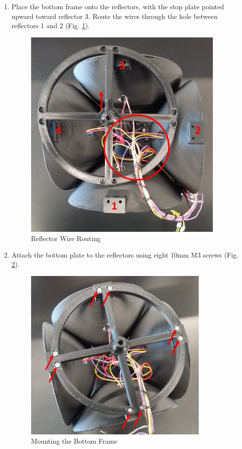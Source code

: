 \begin{enumerate}[label = \textbf{Step \arabic*.}]
    \item Place the bottom frame onto the reflectors, with the stop plate pointed upward toward reflector 3. Route the wires through the hole between reflectors 1 and 2 (Fig. \ref{fig:reflectorWireRouting}).
    \begin{figure}[H]
        \centering
        \includegraphics[width=3.9in]{figs/img/assembly/25-reflectorWireRouting.png}
        \caption{Reflector Wire Routing}
        \label{fig:reflectorWireRouting}
    \end{figure}
    \pagebreak

    \item Attach the bottom plate to the reflectors using eight 10mm M3 screws (Fig. \ref{fig:bottomMounting}).
    \begin{figure}[H]
        \centering
        \includegraphics[width=3.6in]{figs/img/assembly/26-reflectorBottomMounting.png}
        \caption{Mounting the Bottom Frame}
        \label{fig:bottomMounting}
    \end{figure}


\end{enumerate}
